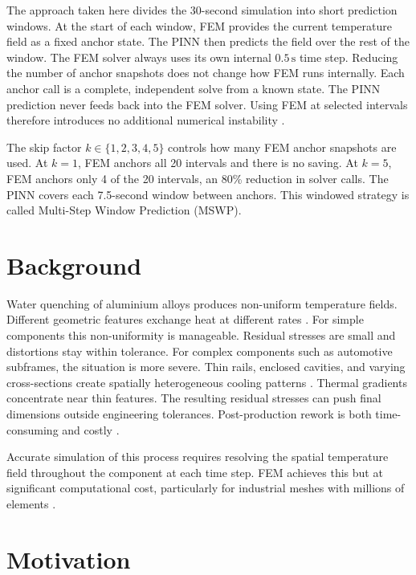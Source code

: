 The approach taken here divides the 30-second simulation into short prediction
windows.
At the start of each window, FEM provides the current temperature field as a
fixed anchor state.
The PINN then predicts the field over the rest of the window.
The FEM solver always uses its own internal $0.5\,\mathrm{s}$ time step.
Reducing the number of anchor snapshots does not change how FEM runs internally.
Each anchor call is a complete, independent solve from a known state.
The PINN prediction never feeds back into the FEM solver.
Using FEM at selected intervals therefore introduces no additional numerical
instability \cite{grossmann2024fem,meng2020ppinn}.

The skip factor $k \in \{1,2,3,4,5\}$ controls how many FEM anchor snapshots
are used.
At $k=1$, FEM anchors all 20 intervals and there is no saving.
At $k=5$, FEM anchors only 4 of the 20 intervals, an 80\% reduction in solver
calls.
The PINN covers each 7.5-second window between anchors.
This windowed strategy is called Multi-Step Window Prediction (MSWP).

\section{Background}
\label{sec:background}

Water quenching of aluminium alloys produces non-uniform temperature fields.
Different geometric features exchange heat at different rates
\cite{xiao2010,wang2019quenching}.
For simple components this non-uniformity is manageable.
Residual stresses are small and distortions stay within tolerance.
For complex components such as automotive subframes, the situation is more
severe.
Thin rails, enclosed cavities, and varying cross-sections create spatially
heterogeneous cooling patterns \cite{mortensen2026}.
Thermal gradients concentrate near thin features.
The resulting residual stresses can push final dimensions outside engineering
tolerances.
Post-production rework is both time-consuming and costly \cite{xiao2010}.

Accurate simulation of this process requires resolving the spatial temperature
field throughout the component at each time step.
FEM achieves this but at significant computational cost, particularly for
industrial meshes with millions of elements
\cite{grossmann2024fem,mortensen2026}.

\section{Motivation}
\label{sec:motivation}

